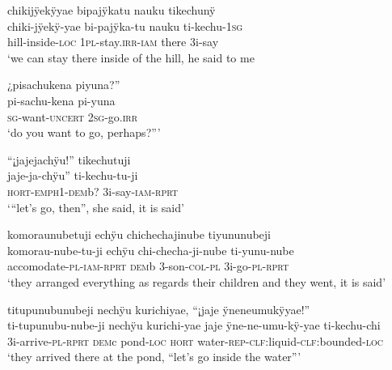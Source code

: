 \ea%
\begingl 
\glpreamble chikijÿekÿyae bipajÿkatu nauku tikechunÿ\\
\gla chiki-jÿekÿ-yae bi-pajÿka-tu nauku ti-kechu-1\textsc{sg}\\ 
\glb hill-inside-\textsc{loc} 1\textsc{pl}-stay.\textsc{irr}-\textsc{iam} there 3i-say\\ 
\glft ‘we can stay there inside of the hill, he said to me\\ 
\endgl
\xe

\ea%
\begingl 
\glpreamble ¿pisachukena piyuna?”\\
\gla pi-sachu-kena pi-yuna\\ 
\textsc{sg}-want-\textsc{uncert} 2\textsc{sg}-go.\textsc{irr}\\ 
\glft ‘do you want to go, perhaps?”’\\ 
\endgl
\xe

\ea%
\begingl 
\glpreamble “¡jajejachÿu!” tikechutuji\\
\gla jaje-ja-chÿu” ti-kechu-tu-ji\\ 
\glb \textsc{hort}-\textsc{emph}1-\textsc{dem}b? 3i-say-\textsc{iam}-\textsc{rprt}\\ 
\glft ‘“let’s go, then”, she said, it is said’\\ 
\endgl
\xe

\ea%
\begingl 
\glpreamble komoraunubetuji echÿu chichechajinube tiyununubeji\\
\gla komorau-nube-tu-ji echÿu chi-checha-ji-nube ti-yunu-nube\\ 
\glb accomodate-\textsc{pl}-\textsc{iam}-\textsc{rprt} \textsc{dem}b 3-son-\textsc{col}-\textsc{pl} 3i-go-\textsc{pl}-\textsc{rprt}\\ 
\glft ‘they arranged everything as regards their children and they went, it is said’\\ 
\endgl
\xe

\newpage
\ea%
\begingl 
\glpreamble titupunubunubeji nechÿu kurichiyae, “¡jaje ÿneneumukÿyae!”\\
\gla ti-tupunubu-nube-ji nechÿu kurichi-yae jaje ÿne-ne-umu-kÿ-yae ti-kechu-chi\\ 
\glb 3i-arrive-\textsc{pl}-\textsc{rprt} \textsc{dem}c pond-\textsc{loc} \textsc{hort} water-\textsc{rep}-\textsc{clf:}liquid-\textsc{clf:}bounded-\textsc{loc}\\ 
\glft ‘they arrived there at the pond, “let’s go inside the water”’\\ 
\endgl
\xe

